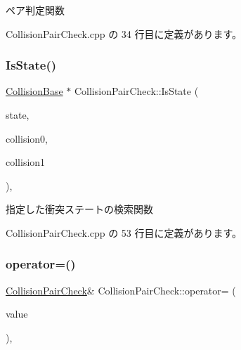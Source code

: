 ペア判定関数 



 Collision\+Pair\+Check.\+cpp の 34 行目に定義があります。

\mbox{\label{class_collision_pair_check_ab0f449965867269dc3115e831547a869}} 
\subsubsection{\texorpdfstring{Is\+State()}{IsState()}}
{\footnotesize\ttfamily \mbox{\hyperlink{class_collision_base}{Collision\+Base}} $\ast$ Collision\+Pair\+Check\+::\+Is\+State (\begin{DoxyParamCaption}\item[{\mbox{\hyperlink{class_collision_base_a4dd1ed00099a19c0176913af93c4e365}{Collision\+Base\+::\+State}}}]{state,  }\item[{\mbox{\hyperlink{class_collision_base}{Collision\+Base}} $\ast$}]{collision0,  }\item[{\mbox{\hyperlink{class_collision_base}{Collision\+Base}} $\ast$}]{collision1 }\end{DoxyParamCaption})\hspace{0.3cm}{\ttfamily [static]}, {\ttfamily [private]}}



指定した衝突ステートの検索関数 



 Collision\+Pair\+Check.\+cpp の 53 行目に定義があります。

\mbox{\label{class_collision_pair_check_a32ebe7303801a6bfa9225c60ddb4b749}} 
\subsubsection{\texorpdfstring{operator=()}{operator=()}}
{\footnotesize\ttfamily \mbox{\hyperlink{class_collision_pair_check}{Collision\+Pair\+Check}}\& Collision\+Pair\+Check\+::operator= (\begin{DoxyParamCaption}\item[{const \mbox{\hyperlink{class_collision_pair_check}{Collision\+Pair\+Check}} \&}]{value }\end{DoxyParamCaption})\hspace{0.3cm}{\ttfamily [private]}, {\ttfamily [delete]}}



